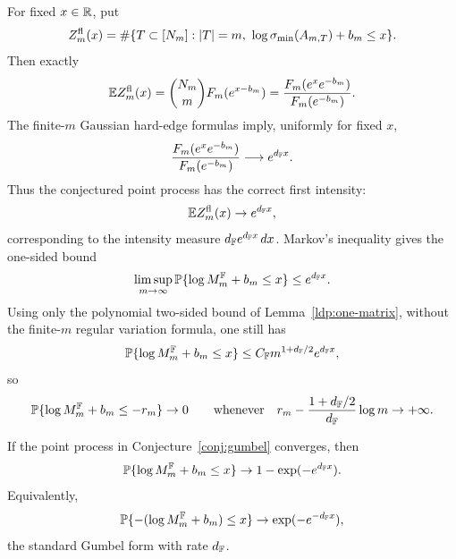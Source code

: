 For fixed \(x\in\mathbb{R}\), put
\[
  Z_m^{\rm fl}(x)=
  \#\{T\subset[N_m]: |T|=m,\ \log\sigma_{\min}(A_{m,T})+b_m\le x\}.
\]
Then exactly
\[
  \mathbb{E} Z_m^{\rm fl}(x)
  =
  \binom{N_m}{m}F_m(e^{x-b_m})
  =
  \frac{F_m(e^x e^{-b_m})}{F_m(e^{-b_m})}.
\]
The finite-\(m\) Gaussian hard-edge formulas imply, uniformly for fixed \(x\),
\[
  \frac{F_m(e^x e^{-b_m})}{F_m(e^{-b_m})}
  \longrightarrow e^{d_{\mathbb{F}} x}.
\]
Thus the conjectured point process has the correct first intensity:
\[
  \mathbb{E} Z_m^{\rm fl}(x)\to e^{d_{\mathbb{F}} x},
\]
corresponding to the intensity measure \(d_{\mathbb{F}} e^{d_{\mathbb{F}} x}\,dx\).  Markov's
inequality gives the one-sided bound
\[
  \limsup_{m\to\infty}
  \mathbb{P}\{\log M_m^{\mathbb{F}}+b_m\le x\}\le e^{d_{\mathbb{F}} x}.
\]
Using only the polynomial two-sided bound of Lemma~\ref{ldp:one-matrix}, without
the finite-\(m\) regular variation formula, one still has
\[
  \mathbb{P}\{\log M_m^{\mathbb{F}}+b_m\le x\}
  \le C_{\mathbb{F}} m^{1+d_{\mathbb{F}}/2}e^{d_{\mathbb{F}} x},
\]
so
\[
  \mathbb{P}\{\log M_m^{\mathbb{F}}+b_m\le-r_m\}\to0
  \qquad
  \text{whenever}\quad
  r_m-\frac{1+d_{\mathbb{F}}/2}{d_{\mathbb{F}}}\log m\to+\infty .
\]

If the point process in Conjecture~\ref{conj:gumbel} converges, then
\[
  \mathbb{P}\{\log M_m^{\mathbb{F}}+b_m\le x\}
  \to 1-\exp(-e^{d_{\mathbb{F}} x}).
\]
Equivalently,
\[
  \mathbb{P}\{-(\log M_m^{\mathbb{F}}+b_m)\le x\}\to \exp(-e^{-d_{\mathbb{F}} x}),
\]
the standard Gumbel form with rate \(d_{\mathbb{F}}\).

